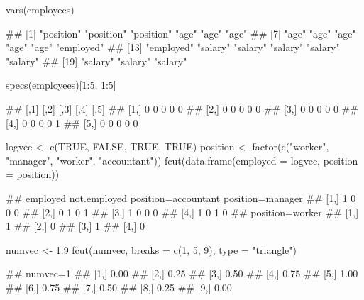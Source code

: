 \documentclass{article}\usepackage[]{graphicx}\usepackage[]{color}
\begin{document}
\begin{Schunk}
% --begin: "lcut.vars"
\begin{Sinput}
vars(employees)
\end{Sinput}
\begin{Soutput}
##  [1] "position" "position" "position" "age"      "age"      "age"     
##  [7] "age"      "age"      "age"      "age"      "age"      "employed"
## [13] "employed" "salary"   "salary"   "salary"   "salary"   "salary"  
## [19] "salary"   "salary"   "salary"
\end{Soutput}
%
% --end: "lcut.vars"
\end{Schunk}

\begin{Schunk}
% --begin: "lcut.specs"
\begin{Sinput}
specs(employees)[1:5, 1:5]
\end{Sinput}
\begin{Soutput}
##      [,1] [,2] [,3] [,4] [,5]
## [1,]    0    0    0    0    0
## [2,]    0    0    0    0    0
## [3,]    0    0    0    0    0
## [4,]    0    0    0    0    1
## [5,]    0    0    0    0    0
\end{Soutput}
%
% --end: "lcut.specs"
\end{Schunk}

\begin{Schunk}
% --begin: "fcut.logfact"
\begin{Sinput}
logvec <- c(TRUE, FALSE, TRUE, TRUE)
position <- factor(c("worker", "manager", "worker", "accountant"))
fcut(data.frame(employed = logvec, position = position))
\end{Sinput}
\begin{Soutput}
##      employed not.employed position=accountant position=manager
## [1,]        1            0                   0                0
## [2,]        0            1                   0                1
## [3,]        1            0                   0                0
## [4,]        1            0                   1                0
##      position=worker
## [1,]               1
## [2,]               0
## [3,]               1
## [4,]               0
\end{Soutput}
%
% --end: "fcut.logfact"
\end{Schunk}

\begin{Schunk}
% --begin: "fcut.numeric1"
\begin{Sinput}
numvec <- 1:9
fcut(numvec, breaks = c(1, 5, 9), type = "triangle")
\end{Sinput}
\begin{Soutput}
##       numvec=1
##  [1,]     0.00
##  [2,]     0.25
##  [3,]     0.50
##  [4,]     0.75
##  [5,]     1.00
##  [6,]     0.75
##  [7,]     0.50
##  [8,]     0.25
##  [9,]     0.00
\end{Soutput}
%
% --end: "fcut.numeric1"
\end{Schunk}
\end{document}
